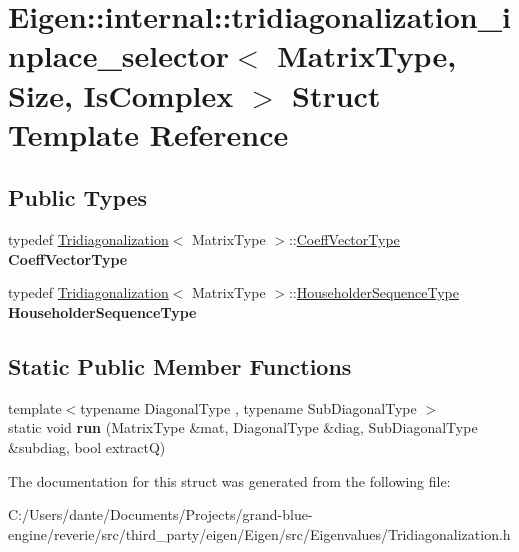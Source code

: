 \hypertarget{struct_eigen_1_1internal_1_1tridiagonalization__inplace__selector}{}\section{Eigen\+::internal\+::tridiagonalization\+\_\+inplace\+\_\+selector$<$ Matrix\+Type, Size, Is\+Complex $>$ Struct Template Reference}
\label{struct_eigen_1_1internal_1_1tridiagonalization__inplace__selector}
\subsection*{Public Types}
\begin{DoxyCompactItemize}
\item 
\mbox{\label{struct_eigen_1_1internal_1_1tridiagonalization__inplace__selector_aa0c24c9b9d075d1c4f325e54c1bfa792}} 
typedef \mbox{\hyperlink{class_eigen_1_1_tridiagonalization}{Tridiagonalization}}$<$ Matrix\+Type $>$\+::\mbox{\hyperlink{class_eigen_1_1_matrix}{Coeff\+Vector\+Type}} {\bfseries Coeff\+Vector\+Type}
\item 
\mbox{\label{struct_eigen_1_1internal_1_1tridiagonalization__inplace__selector_ac2ca4228fbc0d2ddcc22af399326b6c4}} 
typedef \mbox{\hyperlink{class_eigen_1_1_tridiagonalization}{Tridiagonalization}}$<$ Matrix\+Type $>$\+::\mbox{\hyperlink{class_eigen_1_1_householder_sequence}{Householder\+Sequence\+Type}} {\bfseries Householder\+Sequence\+Type}
\end{DoxyCompactItemize}
\subsection*{Static Public Member Functions}
\begin{DoxyCompactItemize}
\item 
\mbox{\label{struct_eigen_1_1internal_1_1tridiagonalization__inplace__selector_aa3eb3bbc4e7086a3ad544980ab86210b}} 
{\footnotesize template$<$typename Diagonal\+Type , typename Sub\+Diagonal\+Type $>$ }\\static void {\bfseries run} (Matrix\+Type \&mat, Diagonal\+Type \&diag, Sub\+Diagonal\+Type \&subdiag, bool extractQ)
\end{DoxyCompactItemize}


The documentation for this struct was generated from the following file\+:\begin{DoxyCompactItemize}
\item 
C\+:/\+Users/dante/\+Documents/\+Projects/grand-\/blue-\/engine/reverie/src/third\+\_\+party/eigen/\+Eigen/src/\+Eigenvalues/Tridiagonalization.\+h\end{DoxyCompactItemize}
